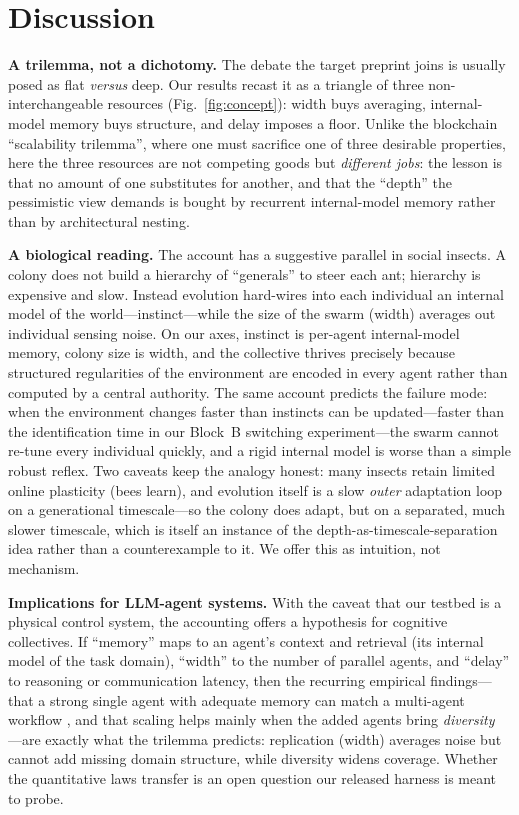 \documentclass[journal]{IEEEtran}
\begin{document}
\section{Discussion}
\label{sec:discussion}
\textbf{A trilemma, not a dichotomy.} The debate the target preprint joins is
usually posed as flat \emph{versus} deep. Our results recast it as a triangle of
three non-interchangeable resources (Fig.~\ref{fig:concept}): width buys
averaging, internal-model memory buys structure, and delay imposes a floor.
Unlike the blockchain ``scalability trilemma'', where one must sacrifice one of
three desirable properties, here the three resources are not competing goods but
\emph{different jobs}: the lesson is that no amount of one substitutes for
another, and that the ``depth'' the pessimistic view demands is bought by
recurrent internal-model memory rather than by architectural nesting.

\textbf{A biological reading.} The account has a suggestive parallel in social
insects. A colony does not build a hierarchy of ``generals'' to steer each ant;
hierarchy is expensive and slow. Instead evolution hard-wires into each
individual an internal model of the world---instinct---while the size of the
swarm (width) averages out individual sensing noise. On our axes, instinct is
per-agent internal-model memory, colony size is width, and the collective
thrives precisely because structured regularities of the environment are encoded
in every agent rather than computed by a central authority. The same account
predicts the failure mode: when the environment changes faster than instincts
can be updated---faster than the identification time in our Block~B switching
experiment---the swarm cannot re-tune every individual quickly, and a rigid
internal model is worse than a simple robust reflex. Two caveats keep the analogy
honest: many insects retain limited online plasticity (bees learn), and
evolution itself is a slow \emph{outer} adaptation loop on a generational
timescale---so the colony does adapt, but on a separated, much slower timescale,
which is itself an instance of the depth-as-timescale-separation idea rather than
a counterexample to it. We offer this as intuition, not mechanism.

\textbf{Implications for LLM-agent systems.} With the caveat that our testbed is
a physical control system, the accounting offers a hypothesis for cognitive
collectives. If ``memory'' maps to an agent's context and retrieval (its internal
model of the task domain), ``width'' to the number of parallel agents, and
``delay'' to reasoning or communication latency, then the recurring empirical
findings---that a strong single agent with adequate memory can match a
multi-agent workflow \cite{xu2026single,tran2026single}, and that scaling helps
mainly when the added agents bring \emph{diversity} \cite{qian2024scaling}---are
exactly what the trilemma predicts: replication (width) averages noise but cannot
add missing domain structure, while diversity widens coverage. Whether the
quantitative laws transfer is an open question our released harness is meant to
probe.
\end{document}
